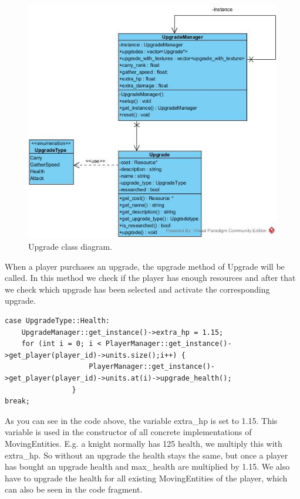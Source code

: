 \begin{figure}[!htb]
    \centering
    \includegraphics[scale=0.75]{res/upgrades.jpg}
    \caption{Upgrade class diagram.}\label{fig:upgrade-figure}
\end{figure}
\newpage
When a player purchases an upgrade, the upgrade method of Upgrade will be called. In this method we check if the player has enough resources and after that we check which upgrade has been selected and activate the corresponding upgrade. 

\begin{lstlisting}
case UpgradeType::Health:
	UpgradeManager::get_instance()->extra_hp = 1.15;
	for (int i = 0; i < PlayerManager::get_instance()->get_player(player_id)->units.size();i++) {	
                    PlayerManager::get_instance()->get_player(player_id)->units.at(i)->upgrade_health();
                }
break;
\end{lstlisting}

As you can see in the code above, the variable extra\_hp is set to 1.15. This variable is used in the constructor of all concrete implementations of MovingEntities. E.g. a knight normally has 125 health, we multiply this with extra\_hp. So without an upgrade the health stays the same, but once a player has bought an upgrade health and max\_health are multiplied by 1.15. We also have to upgrade the health for all existing MovingEntities of the player, which can also be seen in the code fragment.

